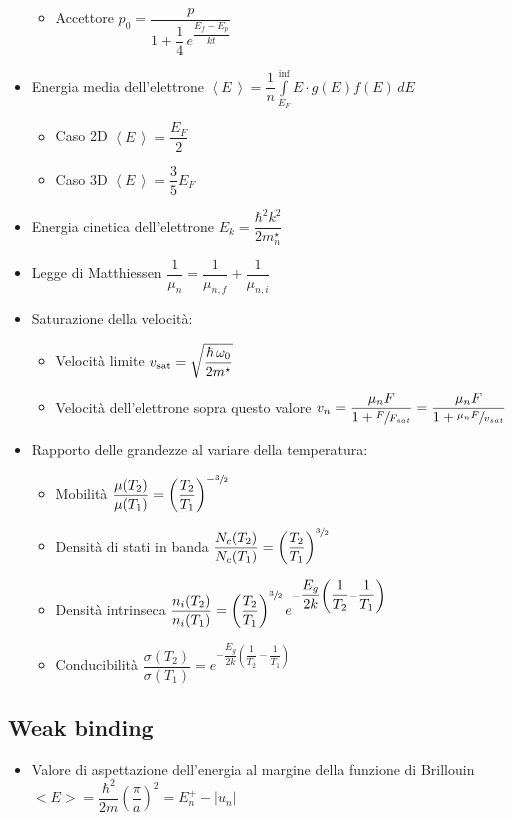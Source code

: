 \documentclass{article}
\begin{document}
\begin{itemize}
\begin{itemize}
          \item Accettore \( p_0 = \dfrac{p}{1 + \dfrac{1}{4} \, e^{\dfrac{E_f-E_p}{kt}}} \)
        \end{itemize}
  \item Energia media dell'elettrone \( \displaystyle \left<E\,\right> = \dfrac{1}{n} \int\limits_{E_F}^{\inf} E \cdot g(E) f(E) \, dE \)
        \begin{itemize}
          \item Caso 2D \(\left<E\,\right> = \dfrac{E_F}{2} \)
          \item Caso 3D \(\left<E\,\right> = \dfrac{3}{5} E_F \)
        \end{itemize}
  \item Energia cinetica dell'elettrone \( E_k = \dfrac{\hbar^2 k^2}{2 m_n^\star} \)
  \item Legge di Matthiessen \( \dfrac{1}{\mu_n} = \dfrac{1}{\mu_{n, f}} + \dfrac{1}{\mu_{n, i}} \)
  \item Saturazione della velocità:
        \begin{itemize}
          \item Velocità limite \( v_{\textnormal{sat}} = \sqrt{\dfrac{\hbar \, \omega_{0}}{2m^\star}} \)
          \item Velocità dell'elettrone sopra questo valore \( v_n = \dfrac{\mu_n F}{1 + \sfrac{F}{F_{sat}}} = \dfrac{\mu_n F }{1 + \sfrac{\mu_n F}{v_{sat}}} \)
        \end{itemize}
  \item Rapporto delle grandezze al variare della temperatura:
        \begin{itemize}
          \item Mobilità \( \dfrac{\mu (T_2)}{\mu (T_1)} = \left( \dfrac{T_2}{T_1} \right) ^ {-\sfrac{3}{2}} \)
          \item Densità di stati in banda \( \dfrac{N_c (T_2)}{N_c  (T_1)} = \left( \dfrac{T_2}{T_1} \right) ^ {\sfrac{3}{2}} \)
          \item Densità intrinseca \( \dfrac{n_i (T_2)}{n_i (T_1)} = \left(\dfrac{T_2}{T_1}\right) ^ {\sfrac{3}{2}} e ^ {- \dfrac{E_g}{2 k} \left(\dfrac{1}{T_2} - \dfrac{1}{T_1} \right) } \)
          \item Conducibilità \( \dfrac{\sigma (T_2)}{\sigma (T_1)} = e ^ {- \dfrac{E_g}{2 k} \left(\dfrac{1}{T_2} - \dfrac{1}{T_1} \right) } \)
        \end{itemize}
\end{itemize}

\subsection{Weak binding}
\begin{itemize}
  \item Valore di aspettazione dell'energia al margine della funzione di Brillouin \( < E > = \dfrac{\hbar ^ 2}{2 m} \left(\dfrac{\pi}{a}\right) ^ 2 = E_n^+ - | u_n | \)
\end{itemize}
\end{document}
